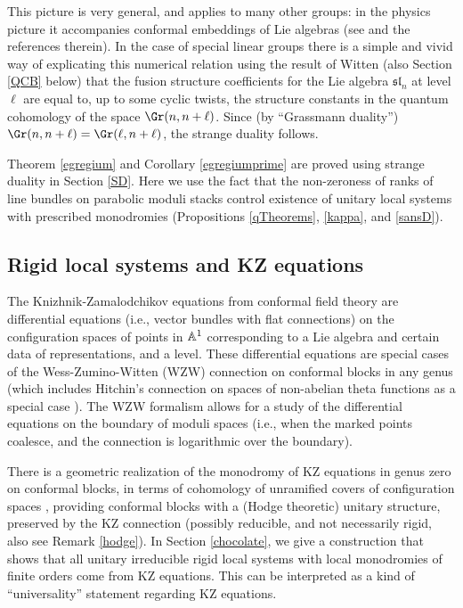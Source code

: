 {This picture is very general, and applies to many other groups: in the physics picture it accompanies conformal embeddings of Lie algebras (see  \cite{BJDG} and the references therein). In the case of special linear groups there is a simple and vivid way of explicating this numerical relation  using the result of  Witten \cite{Witten}  (also Section \ref{QCB} below) that  the fusion structure coefficients for the Lie algebra $\mathfrak{sl}_n$ at level $\ell$ are equal to, up to some cyclic twists, the  structure constants in the quantum cohomology of the space $\Gr(n,n+\ell)$. Since (by ``Grassmann duality'') $\Gr(n,n+\ell)=\Gr(\ell,n+\ell)$, the strange duality follows.

Theorem \ref{egregium} and Corollary \ref{egregiumprime} are proved using strange duality in Section \ref{SD}. Here we use the fact that the non-zeroness of ranks of line bundles on parabolic moduli stacks control existence of unitary local systems with prescribed monodromies (Propositions \ref{qTheorems}, \ref{kappa}, and \ref{sansD}).
 \subsection{Rigid local systems and KZ equations}
 The Knizhnik-Zamalodchikov equations from conformal field theory are  differential equations (i.e., vector bundles with flat connections)
 on the configuration spaces of points in $\Bbb{A}^1$ corresponding to a Lie algebra and certain data of representations, and a level.  These differential equations are special cases of the Wess-Zumino-Witten (WZW) connection on conformal blocks in any genus \cite{tuy} (which includes Hitchin's connection on spaces of non-abelian theta functions as a special case \cite{laszlo}). The WZW formalism allows for a study of the differential equations on the boundary of moduli spaces (i.e., when the marked points coalesce, and the connection is logarithmic over the boundary).

 There is a geometric realization \cite{Ram,BKZ,BM} of the monodromy of KZ equations in genus zero  on conformal blocks, in terms of cohomology of unramified covers of configuration spaces \cite{SV}, providing conformal blocks with a (Hodge theoretic) unitary structure, preserved by the KZ connection (possibly reducible, and not necessarily rigid, also see Remark \ref{hodge}). In Section \ref{chocolate}, we give  a construction that shows that all unitary irreducible rigid local systems with local monodromies  of finite orders come from KZ equations. This can be interpreted as a kind of ``universality'' statement regarding KZ equations.

}
